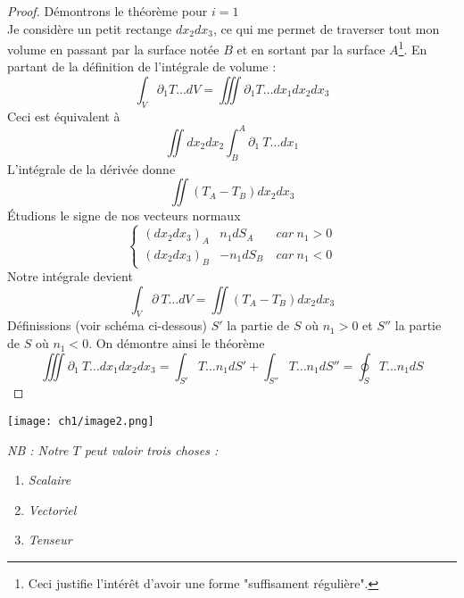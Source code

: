 \begin{proof}
	Démontrons le théorème pour $i=1$\\
	Je considère un petit rectange $dx_2dx_3$, ce qui me permet de traverser tout mon volume en passant
	par la surface notée $B$ et en sortant par la surface $A$\footnote{Ceci justifie l'intérêt d'avoir
	une forme "suffisament régulière".}. En partant de la définition de l'intégrale de volume :
	\begin{equation}
		\int_V \partial_1 T\dots dV = \iiint \partial_1 T\dots dx_1dx_2dx_3
	\end{equation}
	Ceci est équivalent à
	\begin{equation}
		\iint dx_2dx_2\int_B^A \partial_1\ T\dots dx_1
	\end{equation}
	L'intégrale de la dérivée donne
	\begin{equation}
		\iint (T_A-T_B)dx_2dx_3
	\end{equation}
	Étudions le signe de nos vecteurs normaux
	\begin{equation}
		\left\{\begin{array}{lll}
		(dx_2dx_3)_A & n_1dS_A &\ car\ n_1>0  \\
		(dx_2dx_3)_B & -n_1dS_B &\ car\ n_1<0 
		\end{array}\right.
	\end{equation}
	Notre intégrale devient
	\begin{equation}
		\int_V \partial\ T\dots dV = \iint (T_A-T_B)dx_2dx_3
	\end{equation}
	Définissions (voir schéma ci-dessous) $S'$ la partie de $S$ où $n_1>0$ et $S''$ la partie de $S$ où
	$n_1<0$. On démontre ainsi le théorème
	\begin{equation}
		\iiint \partial_1\ T\dots dx_1dx_2dx_3 = \int_{S'} T\dots n_1 dS' + \int_{S''} T\dots n_1 dS'' =
		\oint_S T\dots n_1 dS
	\end{equation}
	    
\end{proof}
\begin{center}
	\texttt{[image: ch1/image2.png]}
\end{center}
   
\textit{NB : Notre $T$ peut valoir trois choses :} 
\begin{enumerate}
	\item \textit{Scalaire}
	\item \textit{Vectoriel}
	\item \textit{Tenseur}
\end{enumerate}
   	
